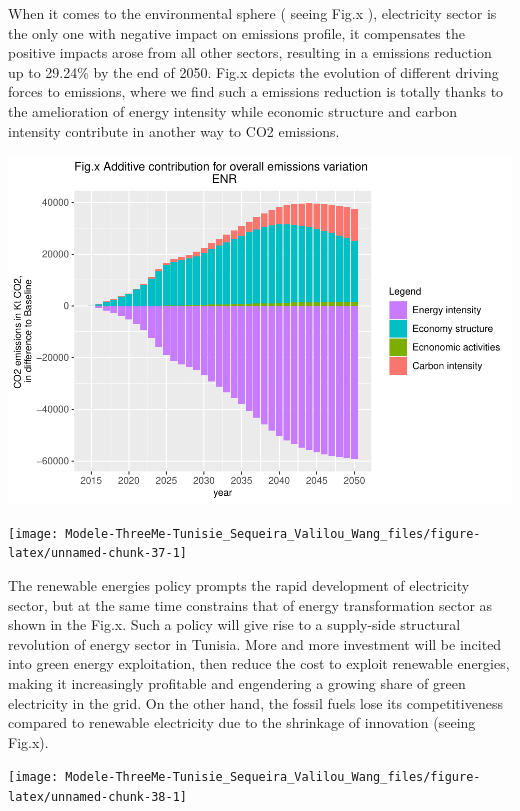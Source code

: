 \documentclass[
]{article}
\begin{document}
When it comes to the environmental sphere ( seeing Fig.x ), electricity
sector is the only one with negative impact on emissions profile, it
compensates the positive impacts arose from all other sectors, resulting
in a emissions reduction up to 29.24\% by the end of 2050. Fig.x depicts
the evolution of different driving forces to emissions, where we find
such a emissions reduction is totally thanks to the amelioration of
energy intensity while economic structure and carbon intensity
contribute in another way to CO2 emissions.

\begin{center}\includegraphics[width=0.7\linewidth,height=0.7\textheight]{Modele-ThreeMe-Tunisie_Sequeira_Valilou_Wang_files/figure-latex/unnamed-chunk-36-1} \end{center}

\begin{center}\texttt{[image: Modele-ThreeMe-Tunisie\_Sequeira\_Valilou\_Wang\_files/figure-latex/unnamed-chunk-37-1]} \end{center}

The renewable energies policy prompts the rapid development of
electricity sector, but at the same time constrains that of energy
transformation sector as shown in the Fig.x. Such a policy will give
rise to a supply-side structural revolution of energy sector in Tunisia.
More and more investment will be incited into green energy exploitation,
then reduce the cost to exploit renewable energies, making it
increasingly profitable and engendering a growing share of green
electricity in the grid. On the other hand, the fossil fuels lose its
competitiveness compared to renewable electricity due to the shrinkage
of innovation (seeing Fig.x).

\begin{center}\texttt{[image: Modele-ThreeMe-Tunisie\_Sequeira\_Valilou\_Wang\_files/figure-latex/unnamed-chunk-38-1]} \end{center}
\end{document}
